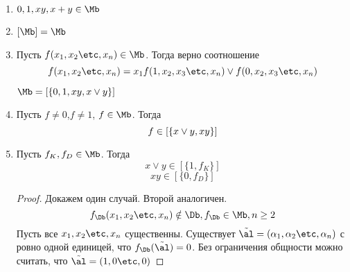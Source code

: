 \documentclass[unicode,10pt]{article}
\begin{document}
    \begin{enumerate}
      \item $0, 1, xy, x+y \in \Mb$
      \item $ [\Mb] = \Mb $
      \item
          \begin{stm}
            Пусть $f(\set[x]{n}) \in \Mb$. Тогда верно соотношение
            \begin{displaymath}
              f(\set[x]{n}) = x_1f(1, \setf[x]{n})\vee f(0, \setf[x]{n})
            \end{displaymath}
          \end{stm}
          \begin{imp}
            \begin{math}
              \Mb =\cls{0, 1, xy, x\vee y}
            \end{math}
          \end{imp}
        \item
          \begin{stm}
            Пусть $f \neq 0$,$f \neq 1$, $f \in \Mb$. Тогда
            \begin{displaymath}
              f \in [\{x\vee{y}, xy\}]
            \end{displaymath}
          \end{stm}
        \item
          \begin{stm}
            Пусть $f_K, f_D \in \Mb$. Тогда
            \begin{displaymath}
              x\vee y \in [\{1, f_K\}]
            \end{displaymath}
            \begin{displaymath}
              xy \in [\{0, f_D\}]
            \end{displaymath}
          \end{stm}
          \begin{proof}
            Докажем один случай. Второй аналогичен.
            \begin{displaymath}
              f_{\Db}(\set[x]{n}) \notin \Db, f_{\Db} \in \Mb, n \ge 2
            \end{displaymath}
            Пусть все $\set[x]{n}$ существенны. Существует $\tilde \al= (\set{n})$
            с ровно одной единицей, что  $f_{\Db}(\tilde \al) = 0$. \WHY
            Без ограничения общности можно считать, что
            \begin{math}
              \alt = (1, 0 \etc, 0)
            \end{math}

\end{proof}
\end{enumerate}
\end{document}
